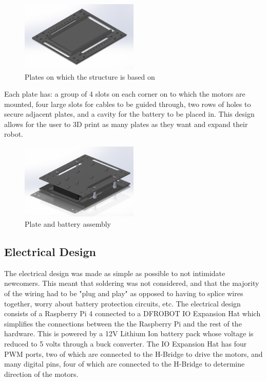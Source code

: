 \documentclass[12pt, letterpaper,titlepage]{article}
\begin{document}
	\begin{figure}[h]
	\includegraphics[width=0.5\textwidth]{plate.png}
	\centering
	\caption{Plates on which the structure is based on}
	\end{figure}

	Each plate has: a group of 4 slots on each corner on to which the motors are mounted, four large slots for cables to be guided through, two rows of holes to secure adjacent plates, and a cavity for the battery to be placed in. This design allows for the user to 3D print as many plates as they want and expand their robot.
	
	\begin{figure}[h]
		\includegraphics[width=0.5\textwidth]{plate_assembly.png}
		\centering
		\caption{Plate and battery assembly}
	\end{figure}

\subsection{Electrical Design}

	The electrical design was made as simple as possible to not intimidate newcomers. This meant that soldering was not considered, and that the majority of the wiring had to be "plug and play" as opposed to having to splice wires together, worry about battery protection circuits, etc. The electrical design consists of a Raspberry Pi 4 connected to a  DFROBOT IO Expansion Hat which simplifies the connections between the the Raspberry Pi and the rest of the hardware. This is powered by a 12V Lithium Ion battery pack whose voltage is reduced to 5 volts through a buck converter. The IO Expansion Hat has four PWM ports, two of which are connected to the H-Bridge to drive the motors, and many digital pins, four of which are connected to the H-Bridge to determine direction of the motors.
\end{document}
